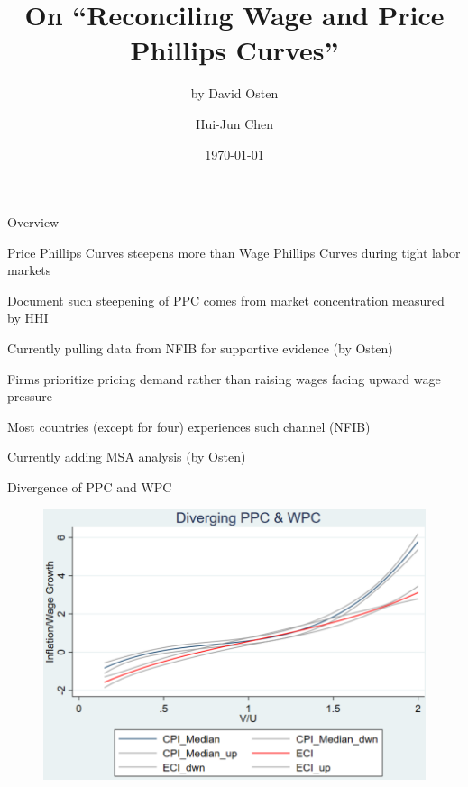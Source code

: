 \documentclass[11pt,aspectratio=169,usenames,dvipsnames]{beamer}
\title{On ``Reconciling Wage and Price Phillips Curves''}
\subtitle{by David Osten}
\author{Hui-Jun Chen}
\institute{National Tsing Hua University}
\date{\today}
\let\tempone\itemize
\let\temptwo\enditemize
\renewenvironment{itemize}{\tempone\addtolength{\itemsep}{\fill}}{\temptwo}
\begin{document}
\begin{frame}[noframenumbering]
    \titlepage
\end{frame}

\begin{frame}{Overview}
\label{slide:Overview}
\begin{description}[Validate]
    \item[Fact] Price Phillips Curves steepens more than Wage Phillips Curves during tight labor markets
    \vfill
    \item[Data] Document such steepening of PPC comes from market concentration measured by HHI
    \begin{itemize}
        \item Currently pulling data from NFIB for supportive evidence (by Osten)
    \end{itemize}
    \vfill
    \item[Channel] Firms prioritize pricing demand rather than raising wages facing upward wage pressure
    \vfill
    \item[Validate] Most countries (except for four) experiences such channel (NFIB)
    \begin{itemize}
        \item Currently adding MSA analysis (by Osten)
    \end{itemize}
\end{description}
\end{frame}

\begin{frame}{Divergence of PPC and WPC}
\label{slide:Divergence_of_PPC_and_WPC}
    \begin{figure}
        \centering
        \includegraphics[width=.6\textwidth]{./figures/Fig1.png}
    \end{figure}
\end{frame}
\end{document}
